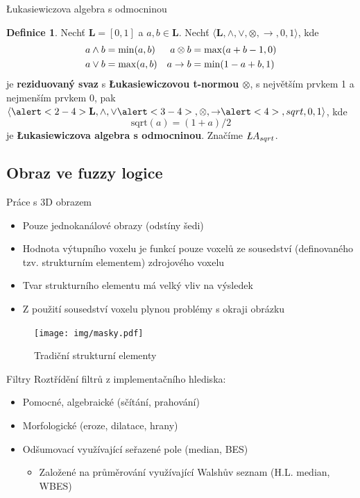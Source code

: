 \documentclass[compress,mathserif]{beamer}
\theoremstyle{definition}
\newtheorem{define}{Definice}
\theoremstyle{plain}
\newcommand{\beI}{\begin{itemize}}
\newcommand{\enI}{\end{itemize}}
\newcommand{\bL}{\mathbf{L}}
\begin{document}
     \begin{frame}{\L ukasiewiczova algebra s odmocninou}
        \begin{define}
            Nechť $\bL = [0,1]$ a $a,b \in \bL$. Nechť $\langle\bL,\wedge,\vee,\otimes,
            \rightarrow,0,1\rangle$, kde
            \begin{align}
                 a \wedge b &= \min(a,b) & a \otimes b &= \max(a+b-1,0)\notag\\
                 a \vee b &= \max(a,b) &  a \rightarrow b &= \min(1-a+b,1)\notag
            \end{align}
            je \textbf{reziduovaný svaz} s \textbf{\L ukasiewiczovou
            t-normou $\otimes$}, s největším prvkem 1 a nejmenším prvkem 0,
            pak $\langle\alert<2-4>{\bL,\wedge,\vee}\alert<3-4>{,\otimes,\rightarrow}\alert<4>{,sqrt},0,1\rangle$, kde
                 $$\mathrm{sqrt}(a) = (1+a)/2$$
            je \textbf{\L ukasiewiczova algebra s odmocninou}. Značíme ${\textit\L} A_{sqrt}$.
        \end{define}
    \end{frame}

    \subsection{Obraz ve fuzzy logice}
     \begin{frame}{Práce s 3D obrazem}
        \beI
            \item Pouze jednokanálové obrazy (odstíny šedi)
            \item \alert<2>{Hodnota výtupního voxelu je funkcí pouze voxelů ze sousedství
                (definovaného tzv. strukturním elementem) zdrojového voxelu}
            \item Tvar strukturního elementu má velký vliv na výsledek
            \item Z použití sousedství voxelu plynou problémy s okraji obrázku
        \enI
            \begin{figure}[h]
              \texttt{[image: img/masky.pdf]}
              \caption{Tradiční strukturní elementy}
            \end{figure}
     \end{frame}


     \begin{frame}{Filtry}
        Roztřídění filtrů z implementačního hlediska:
        \beI
            \item Pomocné, algebraické (sčítání, prahování)
            \item Morfologické (eroze, dilatace, hrany)
            \item Odšumovací využívající seřazené pole (median, BES)
            \beI
                \item Založené na průměrování využívající Walshův seznam (H.L. median, WBES)
            \enI
        \enI
    \end{frame}
\end{document}
